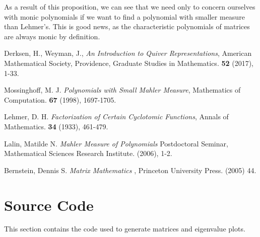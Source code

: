 \documentclass{amsart}
\theoremstyle{theorem}
\theoremstyle{theorem*}
\theoremstyle{definition}
\begin{document}
As a result of this proposition, we can see that we need only to concern ourselves with monic polynomials if we
want to find a polynomial with smaller measure than Lehmer's. This is good news, as the characteristic polynomials
of matrices are always monic by definition.

\begin{thebibliography}{99}

     Derksen, H., Weyman, J., {\em An Introduction to Quiver
            Representations\/}, American Mathematical Society, Providence,
    Graduate Studies in Mathematics. {\bf 52} (2017), 1-33.

     Mossinghoff, M. J. {\em Polynomials with Small Mahler
            Measure\/}, Mathematics of Computation. {\bf 67} (1998), 1697-1705.

     Lehmer, D. H. {\em Factorization of Certain Cyclotomic
            Functions\/}, Annals of Mathematics. {\bf 34} (1933), 461-479.

     Lalin, Matilde N. {\em Mahler Measure of Polynomials\/}
    Postdoctoral Seminar, Mathematical Sciences Research Institute. (2006), 1-2.

     Bernstein, Dennis S. {\em Matrix Mathematics \/},
    Princeton University Press. (2005) 44.
\end{thebibliography}
\pagebreak

\appendix

\section{Source Code}

This section contains the code used to generate matrices and eigenvalue plots.

\tiny

\end{document}
